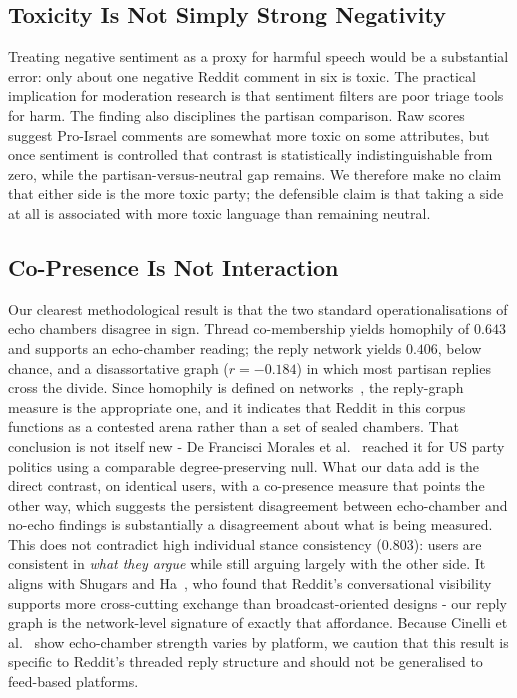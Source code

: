 \documentclass[pdflatex,sn-basic,Numbered,iicol]{sn-jnl}
\begin{document}
\subsection{Toxicity Is Not Simply Strong Negativity}
Treating negative sentiment as a proxy for harmful speech would be a substantial
error: only about one negative Reddit comment in six is toxic. The practical
implication for moderation research is that sentiment filters are poor triage tools
for harm. The finding also disciplines the partisan comparison. Raw scores suggest
Pro-Israel comments are somewhat more toxic on some attributes, but once sentiment is
controlled that contrast is statistically indistinguishable from zero, while the
partisan-versus-neutral gap remains. We therefore make no claim that either side is
the more toxic party; the defensible claim is that taking a side at all is associated
with more toxic language than remaining neutral.

\subsection{Co-Presence Is Not Interaction}
Our clearest methodological result is that the two standard operationalisations of
echo chambers disagree in sign. Thread co-membership yields homophily of $0.643$ and
supports an echo-chamber reading; the reply network yields $0.406$, below chance, and
a disassortative graph ($r=-0.184$) in which most partisan replies cross the divide.
Since homophily is defined on networks~\cite{newman2003}, the
reply-graph measure is the appropriate one, and it indicates that Reddit in this
corpus functions as a contested arena rather than a set of sealed chambers. That
conclusion is not itself new - De Francisci Morales et al.~\cite{defrancisci2021}
reached it for US party politics using a comparable degree-preserving null. What our
data add is the direct contrast, on identical users, with a co-presence measure that
points the other way, which suggests the persistent disagreement between
echo-chamber and no-echo findings is substantially a disagreement about what is
being measured. This does
not contradict high individual stance consistency ($0.803$): users are consistent in
\emph{what they argue} while still arguing largely with the other side. It aligns
with Shugars and Ha~\cite{shugars2025}, who found that Reddit's conversational
visibility supports more cross-cutting exchange than broadcast-oriented designs - our
reply graph is the network-level signature of exactly that affordance. Because
Cinelli et al.~\cite{cinelli2021} show echo-chamber strength varies by platform, we
caution that this result is specific to Reddit's threaded reply structure and should
not be generalised to feed-based platforms.
\end{document}
